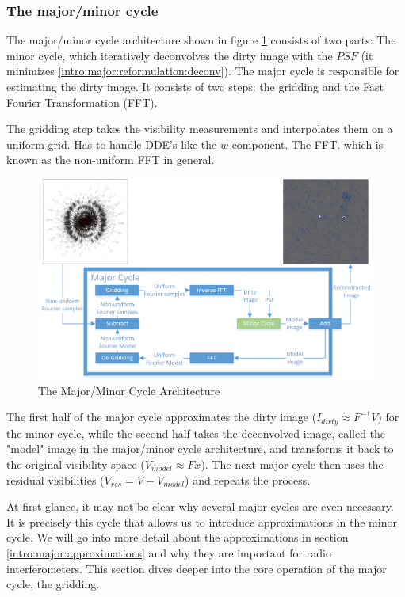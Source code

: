 \subsubsection{The major/minor cycle}
The major/minor cycle architecture shown in figure \ref{intro:major:fig} consists of two parts: The minor cycle, which iteratively deconvolves the dirty image with the $PSF$ (it minimizes \eqref{intro:major:reformulation:deconv}). The major cycle is responsible for estimating the dirty image. It consists of two steps: the gridding and the Fast Fourier Transformation (FFT).

The gridding step takes the visibility measurements and interpolates them on a uniform grid. 
Has to handle DDE's like the $w$-component.
The FFT.
which is known as the non-uniform FFT \cite{kunisnonequispaced} in general.

\begin{figure}[h]
	\centering
	\includegraphics[width=0.90\linewidth]{./chapters/02.hypo/Major-Minor3.png}
	\caption{The Major/Minor Cycle Architecture}
	\label{intro:major:fig}
\end{figure}

The first half of the major cycle approximates the dirty image ($I_{dirty} \approx F^{-1}V$) for the minor cycle, while the second half takes the deconvolved image, called the "model" image in the major/minor cycle architecture, and transforms it back to the original visibility space ($V_{model} \approx Fx$). The next major cycle then uses the residual visibilities ($V_{res} = V - V_{model}$) and repeats the process.

At first glance, it may not be clear why several major cycles are even necessary. It is precisely this cycle that allows us to introduce approximations in the minor cycle. We will go into more detail about the approximations in section \ref{intro:major:approximations} and why they are important for radio interferometers.
This section dives deeper into the core operation of the major cycle, the gridding. 




